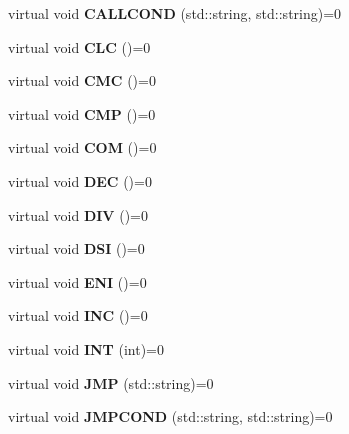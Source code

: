 \begin{DoxyCompactItemize}
\item 
virtual void {\bfseries C\+A\+L\+L\+C\+O\+N\+D} (std\+::string, std\+::string)=0\label{classcdk_1_1basic__postfix__emitter_ab94c46ed1d4702a2aa3b709aa30a53a6}

\item 
virtual void {\bfseries C\+L\+C} ()=0\label{classcdk_1_1basic__postfix__emitter_abd5772172ea0d91ed4da1bd8ee7b2fb5}

\item 
virtual void {\bfseries C\+M\+C} ()=0\label{classcdk_1_1basic__postfix__emitter_a5fe7d27a6bab7a18ee0c0a1b33db119f}

\item 
virtual void {\bfseries C\+M\+P} ()=0\label{classcdk_1_1basic__postfix__emitter_a2f5572c7a7ead89bf463f779826a9aa2}

\item 
virtual void {\bfseries C\+O\+M} ()=0\label{classcdk_1_1basic__postfix__emitter_ad5fa32f0a8a042074a360fe3ad6131ea}

\item 
virtual void {\bfseries D\+E\+C} ()=0\label{classcdk_1_1basic__postfix__emitter_af2249fe5f5dffd58e236e8a92ecce588}

\item 
virtual void {\bfseries D\+I\+V} ()=0\label{classcdk_1_1basic__postfix__emitter_af91bf2f2e22ce0584f7ed2d1ac86784f}

\item 
virtual void {\bfseries D\+S\+I} ()=0\label{classcdk_1_1basic__postfix__emitter_a9d5bdd7531ea1199b37cc04664cb7c52}

\item 
virtual void {\bfseries E\+N\+I} ()=0\label{classcdk_1_1basic__postfix__emitter_a58f2c247bd1e955ab49ba2890a4cca1c}

\item 
virtual void {\bfseries I\+N\+C} ()=0\label{classcdk_1_1basic__postfix__emitter_a0ecfc996fe98accfd7ce91593543adee}

\item 
virtual void {\bfseries I\+N\+T} (int)=0\label{classcdk_1_1basic__postfix__emitter_a7696ceafbfaa94b56e517005c4451d18}

\item 
virtual void {\bfseries J\+M\+P} (std\+::string)=0\label{classcdk_1_1basic__postfix__emitter_a6b69b6284da7299d71b0294ebbbaef60}

\item 
virtual void {\bfseries J\+M\+P\+C\+O\+N\+D} (std\+::string, std\+::string)=0\label{classcdk_1_1basic__postfix__emitter_ab0e8c60b877df9c721b08b156f83fd0c}


\end{DoxyCompactItemize}
